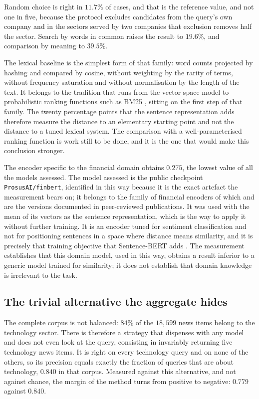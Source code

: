 Random choice is right in $11.7\%$ of cases, and that is the reference value, and not one in five,
because the protocol excludes candidates from the query's own company and in the sectors served by
two companies that exclusion removes half the sector. Search by words in common raises the result
to $19.6\%$, and comparison by meaning to $39.5\%$.

The lexical baseline is the simplest form of that family: word counts projected by hashing and
compared by cosine, without weighting by the rarity of terms, without frequency saturation and
without normalisation by the length of the text. It belongs to the tradition that runs from the
vector space model \autocite{salton1975vsm} to probabilistic ranking functions such as BM25
\autocite{robertson2009bm25}, sitting on the first step of that family. The twenty percentage
points that the sentence representation \autocite{reimers2019sbert} adds therefore measure the
distance to an elementary starting point and not the distance to a tuned lexical system. The
comparison with a well-parameterised ranking function is work still to be done, and it is the one
that would make this conclusion stronger.

The encoder specific to the financial domain obtains $0.275$, the lowest value of all the models
assessed. The model assessed is the public checkpoint \texttt{ProsusAI/finbert}, identified in this
way because it is the exact artefact the measurement bears on; it belongs to the family of
financial encoders of which \textcite{liu2020finbert} and \textcite{huang2023finbert} are the
versions documented in peer-reviewed publications. It was used with the mean of its vectors as the
sentence representation, which is the way to apply it without further training. It is an encoder
tuned for sentiment classification and not for positioning sentences in a space where distance
means similarity, and it is precisely that training objective that Sentence-BERT adds
\autocite{reimers2019sbert}. The measurement establishes that this domain model, used in this way,
obtains a result inferior to a generic model trained for similarity; it does not establish that
domain knowledge is irrelevant to the task.

\subsection{The trivial alternative the aggregate hides}

The complete corpus is not balanced: $84\%$ of the $18{,}599$ news items belong to the
technology sector. There is therefore a strategy that dispenses with any model and does not even
look at the query, consisting in invariably returning five technology news items. It is right on
every technology query and on none of the others, so its precision equals exactly the fraction of
queries that are about technology, $0.840$ in that corpus. Measured against this alternative, and
not against chance, the margin of the method turns from positive to negative: $0.779$ against
$0.840$.


